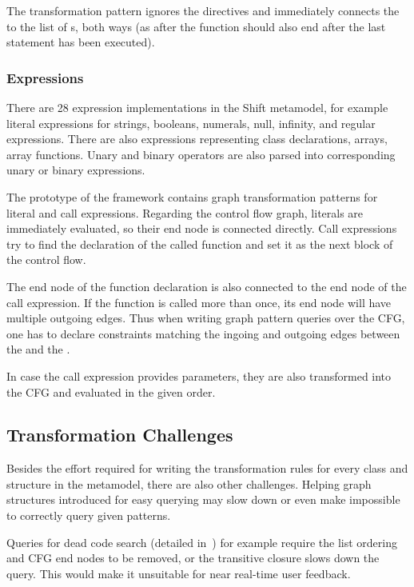 The transformation pattern ignores the directives and immediately connects the  to the list of s, both ways (as after the function should also end after the last statement has been executed).


\subsubsection{Expressions}
There are 28 expression implementations in the Shift metamodel, for example literal expressions for strings, booleans, numerals, null, infinity, and regular expressions. There are also expressions representing class declarations, arrays, array functions. Unary and binary operators are also parsed into corresponding unary or binary expressions.

The prototype of the framework contains graph transformation patterns for literal and call expressions. Regarding the control flow graph, literals are immediately evaluated, so their end node is connected directly. Call expressions try to find the declaration of the called function and set it as the next block of the control flow.

The end node of the function declaration is also connected to the end node of the call expression. If the function is called more than once, its end node will have multiple outgoing edges. Thus when writing graph pattern queries over the CFG, one has to declare constraints matching the ingoing and outgoing edges between the  and the .

In case the call expression provides parameters, they are also transformed into the CFG and evaluated in the given order.

\subsection{Transformation Challenges}
Besides the effort required for writing the transformation rules for every class and structure in the metamodel, there are also other challenges. Helping graph structures introduced for easy querying may slow down or even make impossible to correctly query given patterns.

Queries for dead code search (detailed in~) for example require the list ordering and CFG end nodes to be removed, or the transitive closure slows down the query. This would make it unsuitable for near real-time user feedback.

